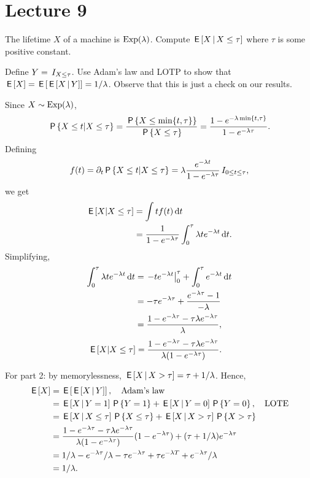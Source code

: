 \documentclass[lectures]{subfiles}
\begin{document}
\section{Lecture 9}
\label{sec:lecture-9}




\begin{exercise}
The lifetime $X$ of a machine is $\Exp{\lambda}$.
Compute $\E{X \given X\leq \tau}$ where $\tau$ is some positive constant.

Define $Y=\1{X\leq \tau}$.  Use  Adam's law and LOTP to show that $\E{X} = \E{\E{X\given Y}} = 1/\lambda$. Observe that this is just a check on our results.
\begin{solution}
Since $X\sim \Exp{\lambda}$,
\begin{equation*}
\P{X\leq t | X\leq \tau} = \frac{\P{X\leq \min\{t, \tau\}}}{\P{X\leq \tau}} = \frac{1-e^{-\lambda\min\{t, \tau\}}}{1-e^{-\lambda \tau}}.
\end{equation*}
 Defining
\begin{equation*}
  f(t) = \partial_{t} \P{X\leq t | X\leq \tau} = \lambda \frac{e^{-\lambda t}}{1-e^{-\lambda \tau}} \1{0\leq t \leq \tau},
\end{equation*}
we get
\begin{align}
  \label{eq:9925}
\E{X|X\leq \tau}
&= \int t f(t) \d t \\
&= \frac{1}{1-e^{-\lambda \tau}}\int_{0}^{\tau} \lambda t e^{-\lambda t} \d t.
\end{align}
Simplifying,
\begin{align}
\label{eq:926}
\int_0^{\tau} \lambda t e^{-\lambda t} \d t
&= \left.- t e^{-\lambda t}\right|_{0}^{\tau} + \int_0^{\tau} e^{-\lambda t} \d t \\
&= -\tau e^{-\lambda \tau} + \frac{e^{-\lambda \tau} -1}{-\lambda} \\
&= \frac{ 1- e^{-\lambda \tau}- \tau \lambda  e^{-\lambda \tau}}{\lambda},
\end{align}
\begin{align}
  \label{eq:925}
\E{X|X\leq \tau}
&= \frac{ 1- e^{-\lambda \tau}- \tau \lambda  e^{-\lambda \tau}}{\lambda(1-e^{-\lambda \tau})}.
\end{align}

For part 2: by memorylessness, $\E{X\given X>\tau} = \tau + 1/\lambda$. Hence,
\begin{align}
  \label{eq:94}
\E X
&= \E{\E{X\given Y}}, \quad \text{Adam's law} \\
&= \E{X\given Y=1}\P{Y=1} + \E{X\given Y=0}\P{Y=0}, \quad \text{LOTE}\\
&= \E{X\given X\leq \tau}\P{X\leq \tau} + \E{X\given X>\tau} \P{X>\tau} \\
&= \frac{ 1- e^{-\lambda \tau}- \tau \lambda  e^{-\lambda \tau}}{\lambda(1-e^{-\lambda \tau})} (1-e^{-\lambda \tau}) + (\tau+ 1/\lambda) e^{-\lambda \tau} \\
&= 1/\lambda - e^{-\lambda \tau}/\lambda - \tau e^{-\lambda \tau} + \tau e^{-\lambda T} + e^{-\lambda \tau}/\lambda \\
&=1/\lambda.
\end{align}


\end{solution}
\end{exercise}
\end{document}
